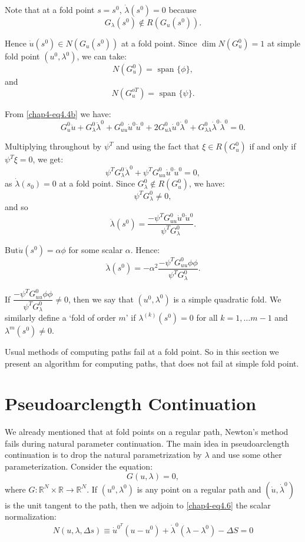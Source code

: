Note that at a fold point $s = s^0$, $\dot{\lambda} (s^0) = 0$
because 
$$
G_\lambda (s^0) \notin R(G_u(s^0)).
$$
 
 Hence $\dot{u}(s^0) \in N(G_u(s^0))$ at a fold point. Since $\dim
 N(G^0_u)=1$ at simple fold point $(u^0,\lambda^0)$, we can take: 
$$
 N(G^0_u)= \text{ span } \{ \phi \},
$$
and
$$
N(G^{oT}_u)= \text{ span } \{ \psi\}. 
$$
 
From \eqref{chap4-eq4.4b} we have:
$$
G_u^0 \ddot{u} +G_\lambda^0 \ddot{\lambda}^0 +G_{uu}^0 \dot{u}^0 
\dot{u}^0 +2 G^0_{u \lambda} \dot{u}^0 \dot{\lambda}^0 + G_{\lambda
 \lambda}^0\dot{\lambda}^0 \dot{\lambda}^0 = 0. 
$$
 
Multiplying throughout by $\psi^{T}$ and using the fact that $\xi \in
R(G_u^0)$ if and only if $\psi^{T} \xi=0$, we get: 
$$
\psi^{T} G^0_\lambda \ddot{\lambda}^0 + \psi^{T} G_{uu}^0 \dot{u}^0
\dot{u}^0=0,  
$$
as $\dot{\lambda} (s_0) = 0$ at a fold point. Since $G_\lambda^0
\notin  R(G^0_u)$, we have: 
$$
\psi^T G^0_\lambda \neq 0,
$$
and so 
$$
\ddot{\lambda} (s^0)= \frac{-\psi^T G^0_{uu}\dot{u}^0 \dot{u}^0}
      {\psi^T G^0_\lambda}. 
$$

But\pageoriginale $\dot{u} (s^0)=\alpha \phi$ for some scalar
$\alpha$. Hence:  
$$
\ddot{\lambda} (s^0) = - \alpha^2 \frac{-\psi^T G^0_{uu}\phi
\phi}{\psi^T G^0_ \lambda} . 
$$
 
If $\dfrac{-\psi^T G^0_{uu}\phi \phi}{\psi^T G^0_ \lambda} \neq 0$,
then we say that $(u^0,\lambda^0)$ is a simple quadratic fold. We
similarly define a `fold of order $m$' if $\lambda ^{(k)} (s^0) = 0$
for all $k=1, \ldots m-1$ and $\lambda ^{m}(s^0) \neq 0$. 

Usual methods of computing paths fail at a fold point. So in this
section we present an algorithm for computing paths, that does not
fail at simple fold point. 
 
\setcounter{section}{4}
\section{Pseudoarclength Continuation}\label{chap4-sec4.5}%

  We already mentioned that at fold points on a regular path, Newton's
 method fails during natural parameter continuation. The main idea in
 pseudoarclength continuation is to drop the natural parametrization
 by $\lambda$ and use some other parameterization. Consider the
 equation: 
 \begin{equation*}
G(u, \lambda ) = 0, \tag{4.6}\label{chap4-eq4.6}
 \end{equation*} 
where $G : \mathbb{R}^N \times \mathbb{R} \to \mathbb{R}^N$. If
$(u^0, \lambda^0)$ is any point on a regular path and
$(\dot{u},\dot{\lambda}^0)$ is the unit tangent to the path, then we
adjoin to \eqref{chap4-eq4.6} the scalar normalization: 
\begin{equation*}
N(u, \lambda , \Delta s) \equiv \dot{u}^{0^T}(u-u^0)+\dot{\lambda}^0
(\lambda  - \lambda^0 )- \Delta S = 0  \tag{4.7}\label{chap4-eq4.7} 
\end{equation*}
 
